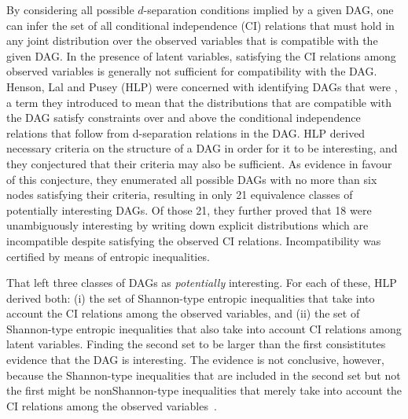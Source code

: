 \documentclass[aps,english,10pt,superscriptaddress,onecolumn,twoside,longbibliography,pra,floatfix,fleqn,nofootinbib]{revtex4-1}%
\newcommand*{\tblue}[1]{{\color{MidnightBlue}{\textbf{#1}}}}
\theoremstyle{definition}
\begin{document}
By considering all possible $d$-separation conditions implied by a given DAG, one can infer the set of all conditional independence (CI) relations that must hold in any joint distribution over the observed variables that is compatible with the given DAG. In the presence of latent variables, satisfying the CI relations among observed variables 
is generally not sufficient for compatibility with the DAG. Henson, Lal and Pusey (HLP) \cite{pusey2014gdag}
  were concerned with identifying DAGs that were \tblue{interesting}, a term they introduced to mean that the distributions that are compatible with the DAG satisfy constraints over and above the conditional independence relations that follow from d-separation relations in the DAG. 
HLP derived necessary criteria on the structure of a DAG in order for it to be interesting, and they conjectured that their criteria may also be sufficient. As evidence in favour of this conjecture, they enumerated all possible DAGs with no more than six nodes satisfying their criteria, resulting in 
only 21 equivalence classes of potentially interesting DAGs.
Of those 21, they further proved that 18 were unambiguously interesting by writing down explicit distributions which are incompatible despite satisfying the observed CI relations. Incompatibility was certified by means of entropic inequalities. 

That left three classes of DAGs  as \emph{potentially} interesting. \color{blue} For each of these, HLP
 derived both: (i) the set of Shannon-type entropic inequalities that take into account the CI relations among the observed variables, and (ii)  the set of Shannon-type entropic inequalities that also take into account CI relations among latent variables.
Finding the second set to be larger than the first consistitutes evidence that the DAG is interesting.
The evidence is not conclusive, however, because the Shannon-type inequalities that are included in the second set but not the first might be nonShannon-type inequalities that merely take into account the CI relations among the observed variables~\cite{pusey2014gdag}. \color{black}
\end{document}
